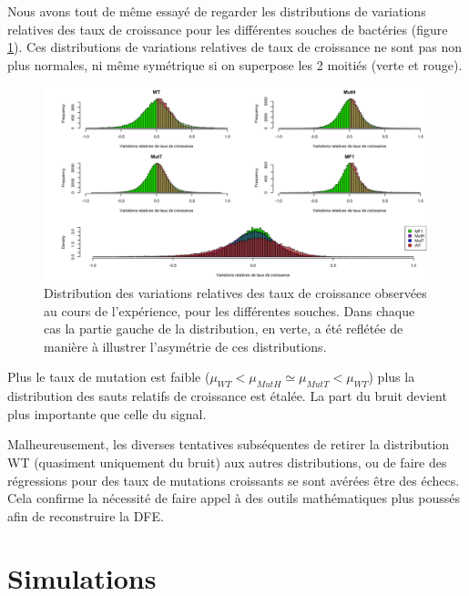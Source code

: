 \documentclass[12pt]{article}
\begin{document}
Nous avons tout de même essayé de regarder les distributions de variations relatives des taux de croissance pour les différentes souches de bactéries (figure \ref{fig:VarRel}). Ces distributions de variations relatives de taux de croissance ne sont pas non plus normales, ni même symétrique si on superpose les 2 moitiés (verte et rouge).

\begin{figure}[!h]
  \begin{center}
    \vspace{3mm}
    \includegraphics[scale=0.3]{../Img/Variations_relatives_GR.png}
  \end{center} 
  \caption{\label{fig:VarRel}Distribution des variations relatives des taux de croissance observées au cours de l'expérience, pour les différentes souches. Dans chaque cas la partie gauche de la distribution, en verte, a été reflétée de manière à illustrer l'asymétrie de ces distributions.}
\end{figure}

Plus le taux de mutation est faible ($\mu_{WT} < \mu_{MutH} \simeq \mu_{MutT} < \mu_{WT}$) plus la distribution des sauts relatifs de croissance est étalée. La part du bruit devient plus importante que celle du signal.

Malheureusement, les diverses tentatives subséquentes de retirer la distribution WT (quasiment uniquement du bruit) aux autres distributions, ou de faire des régressions pour des taux de mutations croissants se sont avérées être des échecs. Cela confirme la nécessité de faire appel à des outils mathématiques plus poussés afin de reconstruire la DFE.

\FloatBarrier
\section{Simulations}
\end{document}
